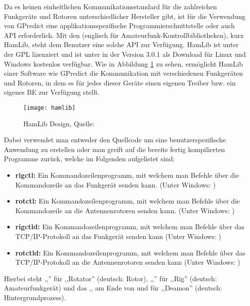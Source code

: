 Da es keinen einheitlichen Kommunikationsstandard für die zahlreichen Funkgeräte und Rotoren unterschiedlicher Hersteller gibt, ist für die Verwendung von GPredict eine applikationsspezifische Programmierschnittstelle oder auch \ac{API} erforderlich. Mit den  (englisch für Amateurfunk-Kontrollbibliotheken), kurz HamLib, steht dem Benutzer eine solche \ac{API} zur Verfügung. HamLib ist unter der \ac{GPL} lizenziert und ist unter \cite{hamlibdownload} in der Version 3.0.1 als Download für Linux und Windows kostenlos verfügbar. Wie in Abbildung \ref{fig:hamlib} zu sehen, ermöglicht HamLib einer Software wie GPredict die Kommunikation mit verschiedenen Funkgeräten und Rotoren, in dem es für jedes dieser Geräte einen eigenen Treiber bzw. ein eigenes \ac{BE} zur Verfügung stellt.

\begin{figure}[h]
	\centering
	\texttt{[image: hamlib]}
	\caption{HamLib Design, Quelle: \cite{hamlibmanual}}
	\label{fig:hamlib} 
\end{figure}

Dabei verwendet man entweder den Quellcode um eine benutzerspezifische Anwendung zu erstellen oder man greift auf die bereits fertig kompilierten Programme zurück, welche im Folgenden aufgelistet sind:

\begin{itemize}
	\parskip0pt
	\item \textbf{rigctl:} Ein Kommandozeilenprogramm, mit welchem man Befehle über die Kommandozeile an das Funkgerät senden kann. (Unter Windows: )
	\item \textbf{rotctl:} Ein Kommandozeilenprogramm, mit welchem man Befehle über die Kommandozeile an die Antennenrotoren senden kann. (Unter Windows: )
	\item \textbf{rigctld:} Ein Kommandozeilenprogramm, mit welchem man Befehle über das TCP/IP-Protokoll an das Funkgerät senden kann (Unter Windows: )
	\item \textbf{rotctld:}  Ein Kommandozeilenprogramm, mit welchem man Befehle über das TCP/IP-Protokoll an die Antennenrotoren senden kann (Unter Windows: )
\end{itemize}

Hierbei steht ,,'' für ,,Rotator'' (deutsch: Rotor), ,,'' für  ,,Rig'' (deutsch: Amateurfunkgerät) und das ,, am Ende von  und  für ,,Deamon'' (deutsch: Hintergrundprozess).


